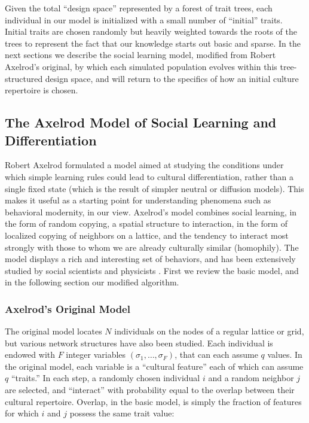\documentclass[referee,graybox,natbib]{svmult}
\begin{document}
Given the total ``design space'' represented by a forest of trait trees,
each individual in our model is initialized with a small number of
``initial'' traits. Initial traits are chosen randomly but heavily
weighted towards the roots of the trees to represent the fact that our
knowledge starts out basic and sparse. In the next sections we describe
the social learning model, modified from Robert Axelrod's original, by
which each simulated population evolves within this tree-structured
design space, and will return to the specifics of how an initial culture
repertoire is chosen.

\subsection{The Axelrod Model of Social Learning and
Differentiation}\label{the-axelrod-model-of-social-learning-and-differentiation}

Robert Axelrod \citeyearpar{axelrod1997} formulated a model aimed at
studying the conditions under which simple learning rules could lead to
cultural differentiation, rather than a single fixed state (which is the
result of simpler neutral or diffusion models). This makes it useful as
a starting point for understanding phenomena such as behavioral
modernity, in our view. Axelrod's model combines social learning, in the
form of random copying, a spatial structure to interaction, in the form
of localized copying of neighbors on a lattice, and the tendency to
interact most strongly with those to whom we are already culturally
similar (homophily). The model displays a rich and interesting set of
behaviors, and has been extensively studied by social scientists and
physicists \citep{castellano2009statistical}. First we review the basic
model, and in the following section our modified algorithm.

\subsubsection{Axelrod's Original Model}\label{axelrods-original-model}

The original model locates $N$ individuals on the nodes of a regular
lattice or grid, but various network structures have also been studied.
Each individual is endowed with $F$ integer variables
$(\sigma_1,\ldots,\sigma_F)$, that can each assume $q$ values. In the
original model, each variable is a ``cultural feature'' each of which
can assume $q$ ``traits.'' In each step, a randomly chosen individual
$i$ and a random neighbor $j$ are selected, and ``interact'' with
probability equal to the overlap between their cultural repertoire.
Overlap, in the basic model, is simply the fraction of features for
which $i$ and $j$ possess the same trait value:
\end{document}
